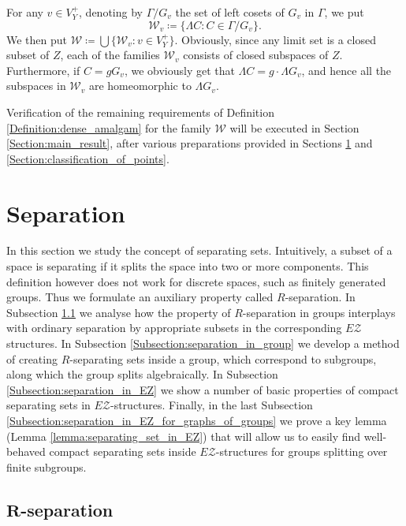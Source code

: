 \documentclass[12pt, a4paper]{article}
\newcommand{\8}{\infty}
\theoremstyle{break}
\theoremstyle{defbreak}
\begin{document}
For any $v\in V_Y^+$, denoting by $\Gamma/G_v$ the set of left cosets
of $G_v$ in $\Gamma$, we put
$$
\mathcal{W}_v\coloneqq\{ \Lambda C : C\in\Gamma/G_v  \}.
$$
We then put $\mathcal{W}\coloneqq\bigcup\{ \mathcal{W}_v:v\in V_Y^+ \}$.
Obviously, since any limit set is a closed subset of $Z$,
each of the families $\mathcal{W}_v$ consists of
closed subspaces of $Z$. Furthermore, if $C=gG_v$,
we obviously get that $\Lambda C=g\cdot\Lambda G_v$,
and hence all the subspaces in $\mathcal{W}_v$
are homeomorphic to $\Lambda G_v$.

Verification of the remaining requirements of Definition \ref{Definition:dense_amalgam} for the family
$\mathcal{W}$ will be executed in Section \ref{Section:main_result}, after various 
preparations provided in Sections \ref{Section:separation} and \ref{Section:classification_of_points}.







\section{Separation}\label{Section:separation}

In this section we study the concept of separating sets. Intuitively, a subset of a space is separating if it splits the space into two or more components. This definition however does not work for discrete spaces, such as finitely generated groups. Thus we formulate an auxiliary property called $R$-separation. In Subsection \ref{Subsection:R_separation_lemma} we analyse how 
the property of $R$-separation in groups interplays with ordinary separation
by appropriate subsets in the corresponding $E\mathcal{Z}$ structures. 
In Subsection \ref{Subsection:separation_in_group} we develop a method of creating $R$-separating sets inside a group, which correspond to subgroups, along which
the group splits algebraically. In Subsection \ref{Subsection:separation_in_EZ} we show a number of basic properties of compact separating sets in $E\mathcal{Z}$-structures. Finally, in the last Subsection \ref{Subsection:separation_in_EZ_for_graphs_of_groups} we prove a key lemma (Lemma \ref{lemma:separating_set_in_EZ}) that will allow us to easily find well-behaved compact separating sets inside $E\mathcal{Z}$-structures for groups splitting
over finite subgroups.


\subsection{\texorpdfstring{$\mathbf{R}$}{R}-separation} \label{Subsection:R_separation_lemma}
\end{document}
